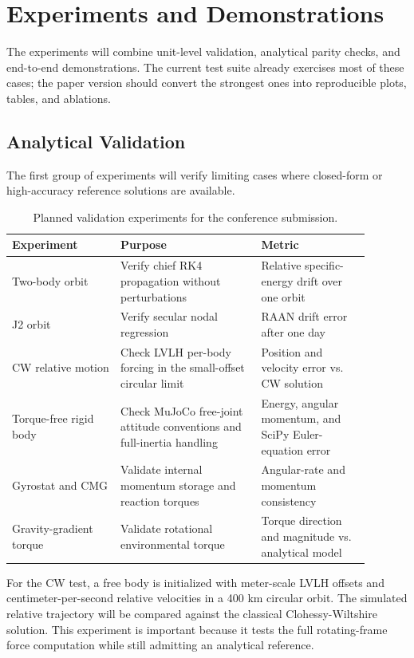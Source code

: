 \section{Experiments and Demonstrations}
\label{sec:experiments}

The experiments will combine unit-level validation, analytical parity
checks, and end-to-end demonstrations. The current test suite already
exercises most of these cases; the paper version should convert the strongest
ones into reproducible plots, tables, and ablations.

\subsection{Analytical Validation}

The first group of experiments will verify limiting cases where closed-form
or high-accuracy reference solutions are available.

\begin{table}[t]
\centering
\caption{Planned validation experiments for the conference submission.}
\label{tab:experiments}
\small
\begin{tabular}{@{}p{0.27\linewidth}p{0.35\linewidth}p{0.27\linewidth}@{}}
\toprule
Experiment & Purpose & Metric \\
\midrule
Two-body orbit & Verify chief RK4 propagation without perturbations & Relative
specific-energy drift over one orbit \\
J2 orbit & Verify secular nodal regression & RAAN drift error after one day \\
CW relative motion & Check LVLH per-body forcing in the small-offset circular
limit & Position and velocity error vs. CW solution \\
Torque-free rigid body & Check MuJoCo free-joint attitude conventions and
full-inertia handling & Energy, angular momentum, and SciPy Euler-equation error \\
Gyrostat and CMG & Validate internal momentum storage and reaction torques &
Angular-rate and momentum consistency \\
Gravity-gradient torque & Validate rotational environmental torque & Torque
direction and magnitude vs. analytical model \\
\bottomrule
\end{tabular}
\end{table}

For the CW test, a free body is initialized with meter-scale LVLH offsets and
centimeter-per-second relative velocities in a 400 km circular orbit. The
simulated relative trajectory will be compared against the classical
Clohessy-Wiltshire solution. This experiment is important because it tests
the full rotating-frame force computation while still admitting an analytical
reference.

